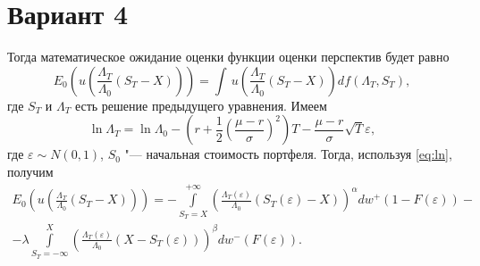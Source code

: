 \documentclass{article}
\begin{document}
\section*{Вариант 4}

Тогда математическое ожидание оценки функции оценки перспектив будет равно
\begin{equation*}
  E_0\left(u\left(\frac{\Lambda_T}{\Lambda_0}\left(S_T - X\right)\right)\right)=\int\,u\left(\frac{\Lambda_T}{\Lambda_0}\left(S_T - X\right)\right)df\left(\Lambda_T, S_T\right) ,
\end{equation*}
где $S_T$ и $\Lambda_T$ есть решение предыдущего уравнения. Имеем
\begin{equation}
  \label{eq:ln}
  \ln\Lambda_T = \ln\Lambda_0 - \left(r + \frac{1}{2}\left(\frac{\mu - r}{\sigma}\right)^2\right)T - \frac{\mu - r}{\sigma}\sqrt{T}\varepsilon ,
\end{equation}
где $\varepsilon\sim N(0,1)$, $S_0$ "--- начальная стоимость портфеля. Тогда, используя \eqref{eq:ln}, получим 
\begin{multline}
  E_0\left(u\left(\frac{\Lambda_T}{\Lambda_0}\left(S_T - X\right)\right)\right)=
  -\int\limits_{S_T = X}^{+\infty}\left(\frac{\Lambda_T\left(\varepsilon\right)}{\Lambda_0}\left(S_T\left(\varepsilon\right) - X\right)\right)^{\alpha}dw^+\left(1-F\left(\varepsilon\right)\right) - \\
  -\lambda\int\limits_{S_T = -\infty}^{X}\left(\frac{\Lambda_T\left(\varepsilon\right)}{\Lambda_0}\left(X - S_T\left(\varepsilon\right)\right)\right)^{\beta}dw^-\left(F\left(\varepsilon\right)\right).
\end{multline}
\end{document}
